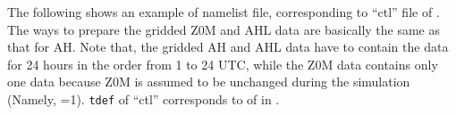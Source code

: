 The following shows an example of namelist file, corresponding to ``ctl'' file of \grads.
%
The ways to prepare the gridded Z0M and AHL data are basically the same as that for AH.
Note that, the gridded AH and AHL data have to contain the data for 24 hours in the order from 1 to 24 UTC,
while the Z0M data contains only one data because Z0M is assumed to be unchanged during the simulation
(Namely, =1).
\verb|tdef| of ``ctl'' corresponds to  of  in \scale.


